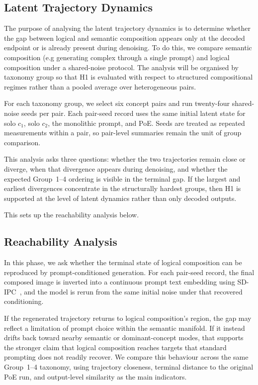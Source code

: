 \subsection{Latent Trajectory Dynamics}
\label{subsec:trajectories}
The purpose of analysing the latent trajectory dynamics is to determine whether the gap between logical and semantic composition appears only at the decoded endpoint or is already present during denoising. 
To do this, we compare semantic composition (e.g generating complex through a single prompt) and logical composition under a shared-noise protocol.
The analysis will be organised by taxonomy group so that H1 is evaluated with respect to structured compositional regimes rather than a pooled average over heterogeneous pairs.

For each taxonomy group, we select six concept pairs and run twenty-four shared-noise seeds per pair. Each pair-seed record uses the same initial latent state for solo $c_1$, solo $c_2$, the monolithic prompt, and PoE. Seeds are treated as repeated measurements within a pair, so pair-level summaries remain the unit of group comparison.

This analysis asks three questions: whether the two trajectories remain close or diverge, when that divergence appears during denoising, and whether the expected Group~1--4 ordering is visible in the terminal gap. If the largest and earliest divergences concentrate in the structurally hardest groups, then H1 is supported at the level of latent dynamics rather than only decoded outputs.

This sets up the reachability analysis below.


\subsection{Reachability Analysis}
\label{subsec:reachability}

In this phase, we ask whether the terminal state of logical composition can be reproduced by prompt-conditioned generation. For each pair-seed record, the final composed image is inverted into a continuous prompt text embedding using SD-IPC~\citep{clip_inverter}, and the model is rerun from the same initial noise under that recovered conditioning.

If the regenerated trajectory returns to logical composition's region, the gap may reflect a limitation of prompt choice within the semantic manifold. If it instead drifts back toward nearby semantic or dominant-concept modes, that supports the stronger claim that logical composition reaches targets that standard prompting does not readily recover. 
We compare this behaviour across the same Group~1--4 taxonomy, using trajectory closeness, terminal distance to the original PoE run, and output-level similarity as the main indicators.

